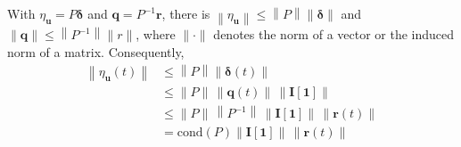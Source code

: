 \documentclass[accepted]{uai2023}
\newcommand{\vect}[1]{\mathbf{#1}}
\newcommand{\Err}{\eta}
\begin{document}
    With $\Err_{\vect{u}} = P \pmb{\delta}$ and $\vect{q} = P^{-1}\vect{r}$, there is $\left\|\Err_{\vect{u}}\right\| \leq \left\|P\right\| \|\pmb{\delta}\|$ and $\|\vect{q}\| \leq \left\|P^{-1}\right\| \|r\|$, where $\|\cdot\|$ denotes the norm of a vector or the induced norm of a matrix. Consequently,
    \begin{align}
        \left\|\Err_{\vect{u}}(t)\right\| &\leq \left\|P\right\| \|\pmb{\delta}(t)\| \\
        &\leq \|P\|\, \|\vect{q}(t)\|\, \left\|\vect{I}[\vect{1}]\right\|\\
        &\leq \|P\|\,\left\|P^{-1}\right\|\, \left\|\vect{I}[\vect{1}]\right\| \, \|\vect{r}(t)\| \\
        &=\mathrm{cond}(P)\left\|\vect{I}[\vect{1}]\right\| \, \|\vect{r}(t)\|
    \end{align}

    
\end{document}
